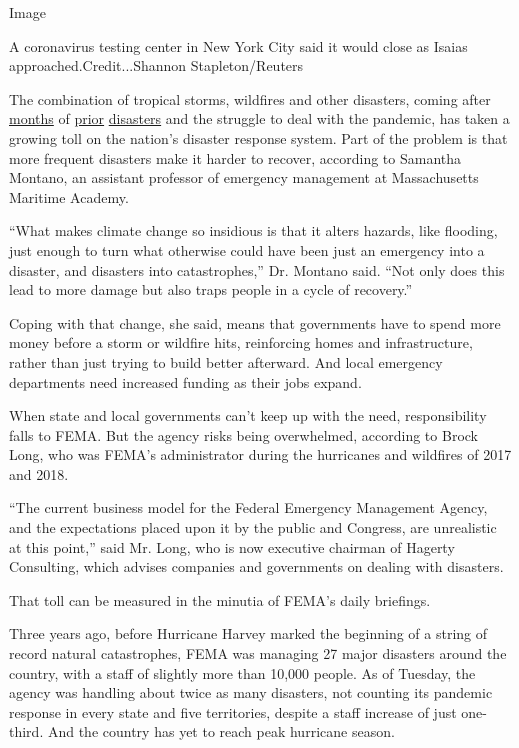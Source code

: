 Image

A coronavirus testing center in New York City said it would close as
Isaias approached.Credit...Shannon Stapleton/Reuters

The combination of tropical storms, wildfires and other disasters,
coming after
\href{https://www.nytimes.com/2020/05/20/us/michigan-flooding-dams-midland.html}{months}
of
\href{https://www.nytimes.com/2020/04/13/us/tornado-storm-south.html}{prior}
\href{https://www.nytimes.com/2020/01/11/us/winter-storm-tornadoes.html}{disasters}
and the struggle to deal with the pandemic, has taken a growing toll on
the nation's disaster response system. Part of the problem is that more
frequent disasters make it harder to recover, according to Samantha
Montano, an assistant professor of emergency management at Massachusetts
Maritime Academy.

``What makes climate change so insidious is that it alters hazards, like
flooding, just enough to turn what otherwise could have been just an
emergency into a disaster, and disasters into catastrophes,'' Dr.
Montano said. ``Not only does this lead to more damage but also traps
people in a cycle of recovery.''

Coping with that change, she said, means that governments have to spend
more money before a storm or wildfire hits, reinforcing homes and
infrastructure, rather than just trying to build better afterward. And
local emergency departments need increased funding as their jobs expand.

When state and local governments can't keep up with the need,
responsibility falls to FEMA. But the agency risks being overwhelmed,
according to Brock Long, who was FEMA's administrator during the
hurricanes and wildfires of 2017 and 2018.

``The current business model for the Federal Emergency Management
Agency, and the expectations placed upon it by the public and Congress,
are unrealistic at this point,'' said Mr. Long, who is now executive
chairman of Hagerty Consulting, which advises companies and governments
on dealing with disasters.

That toll can be measured in the minutia of FEMA's daily briefings.

Three years ago, before Hurricane Harvey marked the beginning of a
string of record natural catastrophes, FEMA was managing 27 major
disasters around the country, with a staff of slightly more than 10,000
people. As of Tuesday, the agency was handling about twice as many
disasters, not counting its pandemic response in every state and five
territories, despite a staff increase of just one-third. And the country
has yet to reach peak hurricane season.


